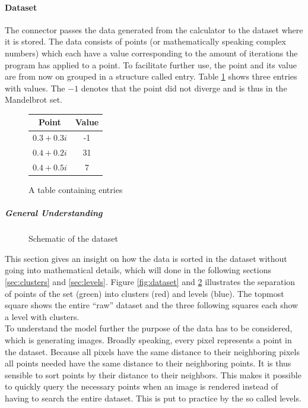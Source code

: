 \documentclass[10pt,a4paper,titlepage]{article}
\begin{document}
	\paragraph{Dataset}
	The connector passes the data generated from the calculator to the dataset where it is stored. The data consists of points (or mathematically speaking complex numbers) which each have a value corresponding to the amount of iterations the program has applied to a point. To facilitate further use, the point and its value are from now on grouped in a structure called entry. Table \ref{fig:entries} shows three entries with values. The \(-1\) denotes that the point did not diverge and is thus in the Mandelbrot set.
	\begin{figure}
		\centering
		\caption{A table containing entries}
		\label{fig:entries}
		\begin{tabular}{c|c}
			Point        & Value \\ \hline
			\(0.3+0.3i\) & -1    \\ \hline
			\(0.4+0.2i\) & 31    \\ \hline
			\(0.4+0.5i\) & 7     \\
		\end{tabular}
	\end{figure}
	\subparagraph{General Understanding}
	\begin{figure}
		\caption{Schematic of the dataset}
		\label{fig:dataset_schematic}
		\centering
		\def\svgwidth{\textwidth}
		
	\end{figure}
	This section gives an insight on how the data is sorted in the dataset without going into mathematical details, which will done in the following sections \ref{sec:clusters} and \ref{sec:levels}. Figure \ref{fig:dataset} and \ref{fig:dataset_schematic} illustrates the separation of points of the set (green) into clusters (red) and levels (blue). The topmost square shows the entire ``raw'' dataset and the three following squares each show a level with clusters.\\
	To understand the model further the purpose of the data has to be considered, which is generating images. Broadly speaking, every pixel represents a point in the dataset. Because all pixels have the same distance to their neighboring pixels all points needed have the same distance to their neighboring points. It is thus sensible to sort points by their distance to their neighbors. This makes it possible to quickly query the necessary points when an image is rendered instead of having to search the entire dataset. This is put to practice by the so called levels.\\
\end{document}
